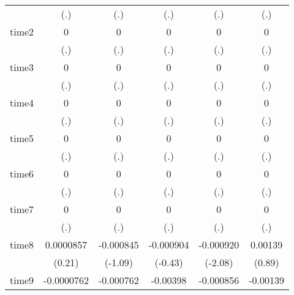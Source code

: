 \begin{table}[htbp]
\begin{tabular}{l*{5}{c}}
            &         (.)         &         (.)         &         (.)         &         (.)         &         (.)         \\
time2       &           0         &           0         &           0         &           0         &           0         \\
            &         (.)         &         (.)         &         (.)         &         (.)         &         (.)         \\
time3       &           0         &           0         &           0         &           0         &           0         \\
            &         (.)         &         (.)         &         (.)         &         (.)         &         (.)         \\
time4       &           0         &           0         &           0         &           0         &           0         \\
            &         (.)         &         (.)         &         (.)         &         (.)         &         (.)         \\
time5       &           0         &           0         &           0         &           0         &           0         \\
            &         (.)         &         (.)         &         (.)         &         (.)         &         (.)         \\
time6       &           0         &           0         &           0         &           0         &           0         \\
            &         (.)         &         (.)         &         (.)         &         (.)         &         (.)         \\
time7       &           0         &           0         &           0         &           0         &           0         \\
            &         (.)         &         (.)         &         (.)         &         (.)         &         (.)         \\
time8       &   0.0000857         &   -0.000845         &   -0.000904         &   -0.000920\sym{*}  &     0.00139         \\
            &      (0.21)         &     (-1.09)         &     (-0.43)         &     (-2.08)         &      (0.89)         \\
time9       &  -0.0000762         &   -0.000762         &    -0.00398         &   -0.000856         &    -0.00139         \\

\end{tabular}
\end{table}
